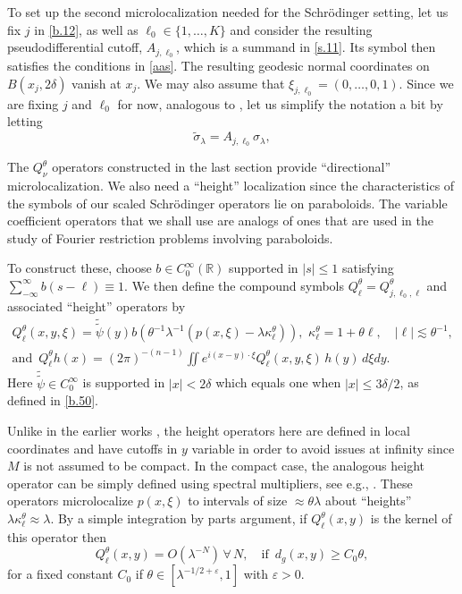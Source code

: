 \documentclass[10pt]{amsart}
\newcommand{\la}{\lambda}
\newcommand{\e}{\varepsilon}
\newcommand{\1}{{\bf 1}}
\newcommand{\R}{{\mathbb R}}
\begin{document}
To set up
the second microlocalization needed for the Schr\"odinger setting, let us fix $j$ in \eqref{b.12}, as well as $\ell_0\in \{1,\dots,K\}$ and consider the resulting
pseudodifferential cutoff, $A_{j,\ell_0}$, which is a summand in \eqref{s.11}.  Its symbol then satisfies
the conditions in \eqref{aas}.  The resulting geodesic normal coordinates on $B(x_j,2\delta)$
vanish at $x_j$.  We may also
assume that $\xi_{j,\ell_0}=(0,\dots,0,1)$.  Since we are fixing
$j$ and $\ell_0$ for now, analogous to \cite{HSst}, let us simplify the notation a bit by letting
\begin{equation}\label{s.23}
\tilde \sigma_\la =A_{j,\ell_0}\sigma_\la,
\end{equation}


The $Q_\nu^\theta$ operators constructed in the last section provide “directional” microlocalization. We 
also need a “height” localization since the characteristics of the symbols of our scaled Schr\"odinger operators lie on
paraboloids. The variable coefficient operators that we shall use  are analogs of ones that are used in the study of Fourier restriction
problems involving paraboloids.












To construct these, choose $b\in C^\infty_0(\R)$ supported in $|s|\le1$  satisfying $\sum_{-\infty}^\infty b(s-\ell)\equiv 1$.
 We then define the compound symbols $Q^\theta_\ell
=Q^\theta_{j,\ell_0,\ell}$ and associated ``height'' operators by
\begin{multline}\label{s.24}
Q^\theta_\ell(x,y,\xi)= \tilde{\tilde \psi}(y)b(\theta^{-1}\la^{-1}(p(x,\xi) -\la\kappa^\theta_\ell)), \, \,
\kappa^\theta_\ell=1+\theta\ell, \quad
|\ell|\lesssim \theta^{-1}, \\ \text{and}\,\,\,
Q^\theta_\ell h(x) = (2\pi)^{-(n-1)}
\iint e^{i(x-y)\cdot \xi}   Q^\theta_\ell(x,y,\xi)\,  h(y) \, d\xi dy.
\end{multline}
Here $\tilde{\tilde \psi} \in C^\infty_0$ is supported in 
$|x|<2\delta$ which equals one when $|x|\le 3\delta/2$, as defined in \eqref{b.50}. 


Unlike in the earlier works \cite{HSst,blair2023strichartz}, the height operators here are defined in local coordinates and have cutoffs in $y$ variable in order to avoid issues at infinity since $M$ is not assumed to be compact. In the compact case, the analogous height operator can be simply defined using spectral multipliers, see e.g., \cite{blair2023strichartz, HSst}.
 These operators microlocalize $p(x,\xi)$ to 
intervals of size $\approx \theta\la$ about ``heights''
$\la\kappa^\theta_\ell\approx \la$. By a simple integration by parts argument, if $Q^\theta_\ell(x,y)$ is the kernel of this operator then
\begin{equation}\label{s.25}
Q^\theta_\ell(x,y)=O(\la^{-N}) \, \forall \, N, \quad
\text{if } \, d_g(x,y)\ge C_0\theta,
\end{equation}
 for a fixed constant $C_0$ if $\theta\in [\la^{-1/2+\e},1]$ with $\e>0$.
\end{document}
